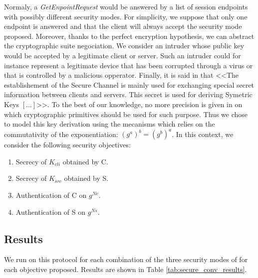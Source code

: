 Normaly, a {\em GetEnpointRequest} would be answered by a list of session
endpoints with possibly different security modes.
For simplicity, we suppose that only one endpoint is answered and that the
client will always accept the security mode proposed.
Moreover, thanks to the perfect encryption hypothesis, we can abstract the
cryptographic suite negociation.
We consider an intruder whose public key would be accepted by a legitimate
client or server.
Such an intruder could for instance represent a legitimate device that has been
corrupted through a virus or that is controlled by a malicious opperator.
Finally, it is said in \cite{MLD09} that <<The establishement of the Secure
Channel is mainly used for exchanging special secret information between clients
and servers. This secret is used for deriving Symetric Keys $[...]$>>.
To the best of our knowledge, no more precision is given in
\cite{MLD09,opcua_part2,opcua_part4,opcua_part6} on which cryptographic
primitives should be used for such purpose.
Thus we chose to model this key derivation using the \DiH mecanisms which
relies on the commutativity of the exponentiation: $(g^a)^b = (g^b)^a$.
In this context, we consider the following security objectives:
\begin{enumerate}
    \item\label{item:sc_sec_cli} Secrecy of $K_{cli}$ obtained by C.
    \item\label{item:sc_sec_srv} Secrecy of $K_{src}$ obtained by S.
    \item\label{item:sc_auth_cli} Authentication of C on $g^{Nc}$.
    \item\label{item:sc_auth_srv} Authentication of S on $g^{Ns}$.
\end{enumerate}

\subsection{Results}\label{sec:secure_conv_res}

We run \proverif on this protocol for each combination of the three security
modes of \opcua for each objective proposed.
Results are shown in Table \ref{tab:secure_conv_results}.

